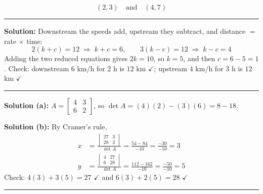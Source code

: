 \documentclass[12pt]{article}
\begin{document}
\[ \boxed{(2,3) \quad \text{and} \quad (4,7)} \]

\vspace{0.2cm}\noindent\rule{\linewidth}{0.2pt}


\textbf{Solution:} Downstream the speeds add, upstream they subtract, and
distance $=$ rate $\times$ time:
\[ 2(k + c) = 12 \;\Longrightarrow\; k + c = 6, \qquad 3(k - c) = 12 \;\Longrightarrow\; k - c = 4 \]
Adding the two reduced equations gives $2k = 10$, so $k = 5$, and then $c = 6 - 5 = 1$.
Check: downstream $6$ km/h for $2$ h is $12$ km $\checkmark$; upstream $4$ km/h for $3$ h is $12$ km $\checkmark$

\vspace{0.2cm}\noindent\rule{\linewidth}{0.2pt}


\textbf{Solution (a):} $A = \begin{bmatrix} 4 & 3 \\ 6 & 2 \end{bmatrix}$, so
$\det A = (4)(2) - (3)(6) = 8 - 18$.

\textbf{Solution (b):} By Cramer's rule,
\begin{align*}
 x &= \frac{\begin{vmatrix} 27 & 3 \\ 28 & 2\end{vmatrix}}{\det A}
    = \frac{54 - 84}{-10} = \frac{-30}{-10} = 3 \\[4pt]
 y &= \frac{\begin{vmatrix} 4 & 27 \\ 6 & 28\end{vmatrix}}{\det A}
    = \frac{112 - 162}{-10} = \frac{-50}{-10} = 5
\end{align*}
Check: $4(3) + 3(5) = 27$ $\checkmark$ and $6(3) + 2(5) = 28$ $\checkmark$

\vspace{0.2cm}\noindent\rule{\linewidth}{0.2pt}

\end{document}
